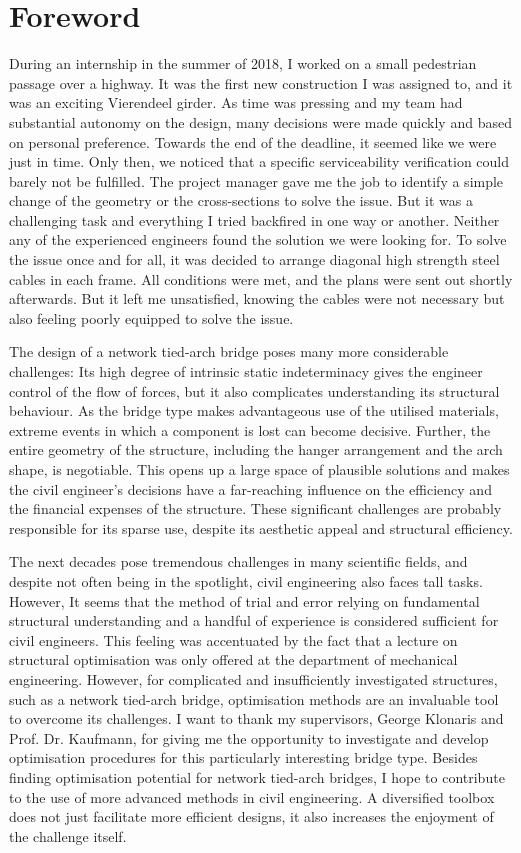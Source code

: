 \chapter*{Foreword}

During an internship in the summer of 2018, I worked on a small pedestrian passage over a highway. It was the first new construction I was assigned to, and it was an exciting Vierendeel girder. As time was pressing and my team had substantial autonomy on the design, many decisions were made quickly and based on personal preference. Towards the end of the deadline, it seemed like we were just in time. Only then, we noticed that a specific serviceability verification could barely not be fulfilled. The project manager gave me the job to identify a simple change of the geometry or the cross-sections to solve the issue. But it was a challenging task and everything I tried backfired in one way or another. Neither any of the experienced engineers found the solution we were looking for. To solve the issue once and for all, it was decided to arrange diagonal high strength steel cables in each frame. All conditions were met, and the plans were sent out shortly afterwards. But it left me unsatisfied, knowing the cables were not necessary but also feeling poorly equipped to solve the issue.\medskip

The design of a network tied-arch bridge poses many more considerable challenges: Its high degree of intrinsic static indeterminacy gives the engineer control of the flow of forces, but it also complicates understanding its structural behaviour. As the bridge type makes advantageous use of the utilised materials, extreme events in which a component is lost can become decisive. Further, the entire geometry of the structure, including the hanger arrangement and the arch shape, is negotiable. This opens up a large space of plausible solutions and makes the civil engineer's decisions have a far-reaching influence on the efficiency and the financial expenses of the structure. These significant challenges are probably responsible for its sparse use, despite its aesthetic appeal and structural efficiency. \medskip

The next decades pose tremendous challenges in many scientific fields, and despite not often being in the spotlight, civil engineering also faces tall tasks. However, It seems that the method of trial and error relying on fundamental structural understanding and a handful of experience is considered sufficient for civil engineers. This feeling was accentuated by the fact that a lecture on structural optimisation was only offered at the department of mechanical engineering. However, for complicated and insufficiently investigated structures, such as a network tied-arch bridge, optimisation methods are an invaluable tool to overcome its challenges. I want to thank my supervisors, George Klonaris and Prof. Dr. Kaufmann, for giving me the opportunity to investigate and develop optimisation procedures for this particularly interesting bridge type. Besides finding optimisation potential for network tied-arch bridges, I hope to contribute to the use of more advanced methods in civil engineering. A diversified toolbox does not just facilitate more efficient designs, it also increases the enjoyment of the challenge itself.